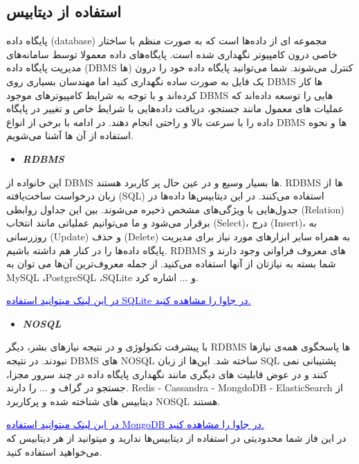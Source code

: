 \documentclass[]{article}
\begin{document}
\subsection*{{\titr استفاده از دیتابیس}}

پایگاه داده (database) مجموعه ای از داده‌ها است که به صورت منظم با ساختار خاصی درون کامپیوتر نگهداری شده است. پایگاه‌های داده معمولا توسط سامانه‌های مدیریت پایگاه داده (DBMS ها) کنترل می‌شوند. شما می‌توانید پایگاه داده خود را درون یک فایل به صورت ساده نگهداری کنید اما مهندسان بسیاری روی DBMS ها کار کرده‌اند و با توجه به شرایط کامپیوترهای موجود DBMS هایی را توسعه داده‌اند که عملیات های معمول مانند جستجو، دریافت داده‌هایی با شرایط خاص و تغییر در پایگاه داده را با سرعت بالا و راحتی انجام دهند. در ادامه با برخی از انواع DBMS ها و نحوه استفاده از آن ها آشنا می‌شویم.

\begin{itemize}
\item \textbf{\emph{ RDBMS }}
\end{itemize}

این خانواده از DBMS ها بسیار وسیع و در عین حال پر کاربرد هستند. RDBMS ها از زبان درخواست ساخت‌یافته (SQL) استفاده می‌کنند. در این دیتابیس‌ها داده‌ها در جدول‌هایی با ویژگی‌های مشخص ذخیره می‌شوند. بین این جداول روابطی (Relation) برقرار می‌شود و ما می‌توانیم عملیاتی مانند انتخاب (Select)، درج (Insert)، به روزرسانی (Update) و حذف (Delete) به همراه سایر ابزارهای مورد نیاز برای مدیریت پایگاه داده‌ها را در کنار هم داشته باشیم. RDBMS های معروف فراوانی وجود دارند و شما بسته به نیازتان از آنها استفاده می‌کنید. از جمله معروف‌ترین آن‌ها می توان به MySQL ،PostgreSQL ،SQLite و ... اشاره کرد.

\href{https://www.tutorialspoint.com/sqlite/sqlite_java.htm}{\textcolor{blue}{\underline{در این لینک میتوانید استفاده SQLite در جاوا را مشاهده کنید.}}}
\\

\begin{itemize}
\item \textbf{\emph{ NOSQL }}
\end{itemize}

با پیشرفت تکنولوژی و در نتیجه نیاز‌های بشر، دیگر RDBMS ها پاسخگوی همه‌ی نیازها نبودند. در نتیجه DBMS های NOSQL ساخته شد. این‌ها از زبان SQL پشتیبانی نمی کنند و در عوض قابلیت های دیگری مانند نگهداری پایگاه داده در چند سرور مجزا، جستجو در گراف و ... را دارند. Redis - Cassandra - MongdoDB - ElasticSearch  از دیتابیس های شناخته شده و پرکاربرد NOSQL هستند.

\href{https://www.tutorialspoint.com/mongodb/mongodb_java.htm}{\textcolor{blue}{\underline{در این لینک میتوانید استفاده MongoDB در جاوا را مشاهده کنید.}}}
\\

در این فاز شما محدودیتی در استفاده از دیتابیس‌ها ندارید و میتوانید از هر دیتابیس که می‌خواهید استفاده کنید.
\end{document}
